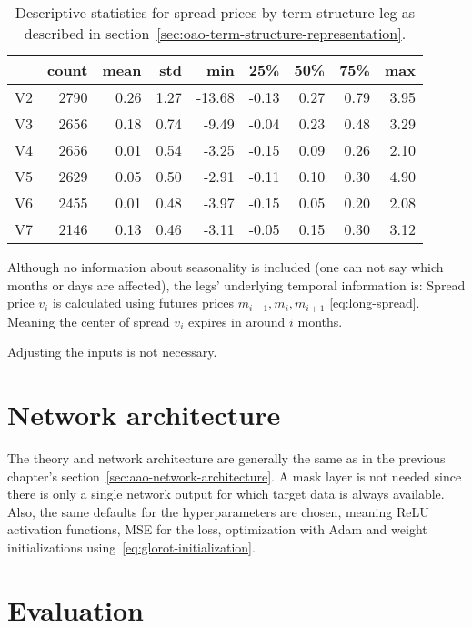 \begin{table}
	\centering
	\caption[Descriptive statistics for spread prices by term structure leg]{Descriptive statistics for spread prices by term structure leg as described in section~\ref{sec:oao-term-structure-representation}.}
	\begin{tabular}{lrrrrrrrr}
		\toprule
		{} &  count &  mean &  std &    min &   25\% &  50\% &  75\% &  max \\
		\midrule
		V2 & 2790 &  0.26 & 1.27 & -13.68 & -0.13 & 0.27 & 0.79 & 3.95 \\
		V3 & 2656 &  0.18 & 0.74 &  -9.49 & -0.04 & 0.23 & 0.48 & 3.29 \\
		V4 & 2656 &  0.01 & 0.54 &  -3.25 & -0.15 & 0.09 & 0.26 & 2.10 \\
		V5 & 2629 &  0.05 & 0.50 &  -2.91 & -0.11 & 0.10 & 0.30 & 4.90 \\
		V6 & 2455 &  0.01 & 0.48 &  -3.97 & -0.15 & 0.05 & 0.20 & 2.08 \\
		V7 & 2146 &  0.13 & 0.46 &  -3.11 & -0.05 & 0.15 & 0.30 & 3.12 \\
		\bottomrule
	\end{tabular}
	\label{tab:spreads-by-leg}
\end{table}

Although no information about seasonality is included (one can not say which months or days are affected), the legs' underlying temporal information is: Spread price $v_i$ is calculated using futures prices $m_{i-1}, m_i, m_{i+1}$ \eqref{eq:long-spread}. Meaning the center of spread $v_i$ expires in around $i$ months.

Adjusting the inputs is not necessary.

\section{Network architecture}

The theory and network architecture are generally the same as in the previous chapter's section~\ref{sec:aao-network-architecture}. A mask layer is not needed since there is only a single network output for which target data is always available. Also, the same defaults for the hyperparameters are chosen, meaning ReLU activation functions, MSE for the loss, optimization with Adam and weight initializations using~\eqref{eq:glorot-initialization}.

\section{Evaluation}

